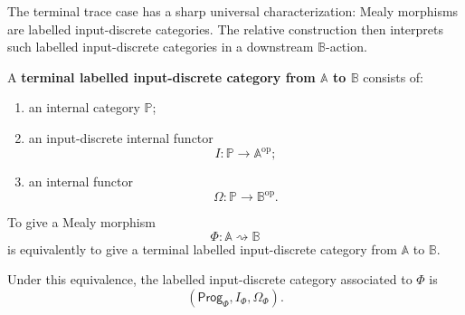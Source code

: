 The terminal trace case has a sharp universal characterization: Mealy
morphisms are labelled input-discrete categories. The relative construction
then interprets such labelled input-discrete categories in a downstream
\(\mathbb B\)-action.

\begin{definition}
\label{def:terminal-labelled-input-discrete-category}
A \textbf{terminal labelled input-discrete category from \(\mathbb A\) to
\(\mathbb B\)} consists of:
\begin{enumerate}
\item an internal category \(\mathbb P\);
\item an input-discrete internal functor
\[
I:\mathbb P\to\mathbb A^{\mathrm{op}};
\]
\item an internal functor
\[
\Omega:\mathbb P\to\mathbb B^{\mathrm{op}}.
\]
\end{enumerate}
\end{definition}

\begin{theorem}
\label{thm:mealy-as-labelled-input-discrete-relative}
To give a Mealy morphism
\[
\Phi:\mathbb A\rightsquigarrow\mathbb B
\]
is equivalently to give a terminal labelled input-discrete category from
\(\mathbb A\) to \(\mathbb B\).

Under this equivalence, the labelled input-discrete category associated to
\(\Phi\) is
\[
\left(
\mathsf{Prog}_\Phi,
I_\Phi,
\Omega_\Phi
\right).
\]
\end{theorem}

